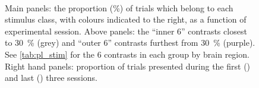 \begin{figure}[htbp]%
    \centering
    \hspace*{\fill}
    \hspace*{\fill}\hspace{.2cm}\hspace*{\fill}
    \hspace*{\fill}
    \\
    \hspace*{\fill}
    \hspace*{\fill}\hspace{.2cm}\hspace*{\fill}
    \hspace*{\fill}
    \caption{
Main panels: the proportion (\%) of trials which belong to each stimulus class, with colours indicated to the right, as a function of experimental session.
Above panels: the ``inner \num{6}'' contrasts closest to \SI{30}{\percent} (grey) and ``outer \num{6}'' contrasts furthest from \SI{30}{\percent} (purple).
See \autoref{tab:pl_stim} for the \num{6} contrasts in each group by brain region.
Right hand panels: proportion of trials presented during the first () and last () three sessions.
}
    \label{fig:class_balance}
\end{figure}


